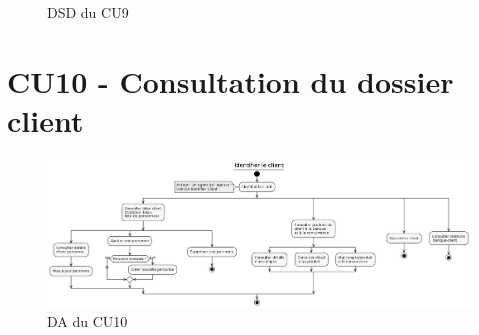 \begin{figure}[H]
\noindent{}
\caption{DSD du CU9}
\end{figure}

\clearpage
\section{CU10 - Consultation du dossier client}
\begin{figure}[H]
\centering
\includegraphics[width=22cm, angle=90]{figures/DA_CU10.png}
\caption{DA du CU10}
\end{figure}


